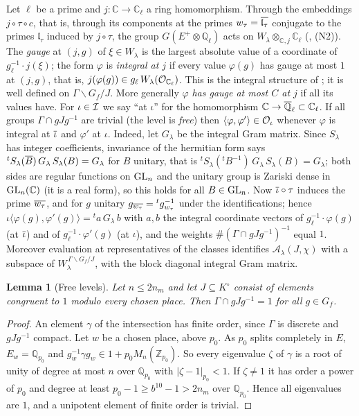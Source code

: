 \documentclass[10pt]{amsart}
\newtheorem{lemma}[theorem]{Lemma}
\theoremstyle{definition}
\theoremstyle{remark}
\newcommand{\C}{\mathbb C}
\newcommand{\Z}{\mathbb Z}
\newcommand{\Q}{\mathbb Q}
\begin{document}
Let $\ell$ be a prime and $j\colon\C\to\C_\ell$ a ring homomorphism. Through the embeddings
$j\circ\tau\circ c$, that is, through its components at the primes
$w_\tau=\overline{\mathfrak l_\tau}$ conjugate to the primes $\mathfrak l_\tau$ induced by $j\circ\tau$,
the group $G(E^+\otimes\Q_\ell)$ acts on $W_\lambda\otimes_{\C,j}\C_\ell$ ({\cite[\S6.1]{P49}}, (N2)). The
\emph{gauge} at $(j,g)$ of $\xi\in W_\lambda$ is the largest absolute value of a coordinate of
$g_\ell^{-1}\cdot j(\xi)$; the form $\varphi$ is \emph{integral at $j$} if every value
$\varphi(g)$ has gauge at most $1$ at $(j,g)$, that is, $j(\varphi(g))\in g_\ell\,W_\lambda
(\auO_{\C_\ell})$. This is the integral structure of \cite{GrossAMF}; it is well defined on
$\Gamma\backslash G_f/J$. More generally $\varphi$ \emph{has gauge at most $C$ at $j$} if all its
values have. For $\iota\in\mathcal I$ we say ``at $\iota$'' for the homomorphism $\C\to\auQlb\subset
\C_\ell$. If all groups $\Gamma\cap gJg^{-1}$ are trivial (the level is \emph{free}) then
$\langle\varphi,\varphi'\rangle\in\mathcal O_\iota$ whenever $\varphi$ is integral at $\overline{\iota}$ and
$\varphi'$ at $\iota$. Indeed, let $G_\lambda$ be the integral Gram matrix. Since $S_\lambda$ has
integer coefficients, invariance of the hermitian form says ${}^tS_\lambda(\overline{B})\,G_\lambda\,
S_\lambda(B)=G_\lambda$ for $B$ unitary, that is ${}^tS_\lambda({}^tB^{-1})\,G_\lambda\,S_\lambda(B)
=G_\lambda$; both sides are regular functions on $\mathrm{GL}_n$ and the unitary group is Zariski dense
in $\auGL_n(\C)$ (it is a real form), so this holds for all $B\in\mathrm{GL}_n$. Now $\overline{\iota}\circ\tau$
induces the prime $\overline{w_\tau}$, and for $g$ unitary $g_{\overline{w_\tau}}={}^tg_{w_\tau}^{-1}$
under the identifications; hence $\iota\langle\varphi(g),\varphi'(g)\rangle={}^ta\,G_\lambda\,b$
with $a,b$ the integral coordinate vectors of $g_\ell^{-1}\cdot\varphi(g)$ (at $\overline{\iota}$) and of
$g_\ell^{-1}\cdot\varphi'(g)$ (at $\iota$), and the weights $\#(\Gamma\cap gJg^{-1})^{-1}$ equal
$1$. Moreover evaluation at representatives of the classes identifies
$\mathcal A_\lambda(J,\chi)$ with a subspace of $W_\lambda^{\,\Gamma\backslash G_f/J}$, with the
block diagonal integral Gram matrix.

\begin{lemma}[Free levels]\label{au:free}
Let $n\le2n_m$ and let $J\subseteq K^\circ$ consist of elements congruent to $1$ modulo every
chosen place. Then $\Gamma\cap gJg^{-1}=1$ for all $g\in G_f$.
\end{lemma}
\begin{proof}
An element $\gamma$ of the intersection has finite order, since $\Gamma$ is discrete and $gJg^{-1}$
compact. Let $w$ be a chosen place, above $p_0$. As $p_0$ splits completely in $E$, $E_w=\Q_{p_0}$
and $g_w^{-1}\gamma g_w\in1+p_0M_n(\Z_{p_0})$. So every eigenvalue $\zeta$ of $\gamma$ is a root of
unity of degree at most $n$ over $\Q_{p_0}$ with $|\zeta-1|_{p_0}<1$. If $\zeta\ne1$ it has order a
power of $p_0$ and degree at least $p_0-1\ge b^{10}-1>2n_m$ over $\Q_{p_0}$. Hence all eigenvalues
are $1$, and a unipotent element of finite order is trivial.
\end{proof}
\end{document}
